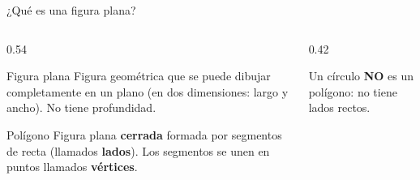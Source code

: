 \documentclass[aspectratio=169, 10pt, spanish]{beamer}
\begin{document}
\begin{frame}{¿Qué es una figura plana?}
  \begin{columns}[c]
    \begin{column}{0.54\textwidth}
      \begin{definicionbox}{Figura plana}
        Figura geométrica que se puede dibujar completamente en
        un plano (en dos dimensiones: largo y ancho).
        No tiene profundidad.
      \end{definicionbox}
      \vspace{0.3cm}
      \begin{definicionbox}{Polígono}
        Figura plana \textbf{cerrada} formada por segmentos de recta
        (llamados \textbf{lados}). Los segmentos se unen en puntos
        llamados \textbf{vértices}.
      \end{definicionbox}
    \end{column}
    \begin{column}{0.42\textwidth}
      \begin{center}
      \end{center}
      \begin{notabox}[Clave]
        \AlmFontScript Un círculo \textbf{NO} es un polígono:
        no tiene lados rectos.
      \end{notabox}
    \end{column}
  \end{columns}
\end{frame}
\end{document}
